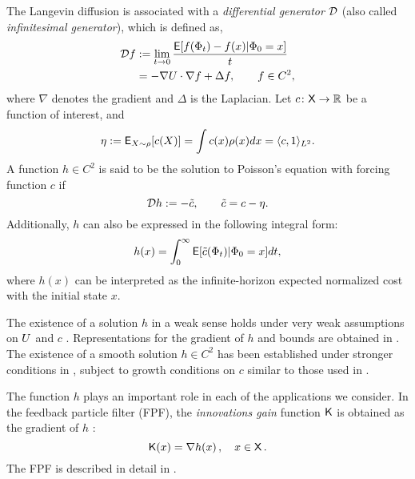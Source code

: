 
The Langevin diffusion is associated with a \textit{differential generator} ${\cal D}$ (also called \textit{infinitesimal generator}), which is defined as,
\begin{equation}
\begin{aligned}
\generate f &:= \lim_{t \to 0} \frac{\Expect [ f(\markovstate_t) - f(x) | \markovstate_0 = x]}{t} \\
& = -\nabla \pot \cdot \nabla f + \Delta f,\qquad f\in C^2,
\label{e:lang_generator}
\end{aligned}
\end{equation}
where $\nabla$ denotes the gradient and $\Delta$ is the Laplacian. Let $c \colon {\sf X} \to \mathbb{R}$ be a function of interest, and 
\[
\eta := {\sf E}_{X \sim \rho}[c(X)] =  \int c(x) \rho(x) dx = \langle c, 1 \rangle_{L^2}.
\]
A function $h\in C^2$ is said to be the solution to Poisson's equation with forcing function $c$ if
\begin{equation}
\generate h := - \tilc, \qquad  \tilc = c - \eta.
\label{e:poissons}
\end{equation}
Additionally, $h$ can also be expressed in the following integral form:
\[
h(x) =\int_0^\infty {\sf E}[\tilde c(\Phi_t)|\Phi_0 = x] dt,
\]
where $h(x)$ can be interpreted as the infinite-horizon expected normalized cost with the initial state $x$. 

The existence of a solution $h$ in a weak sense holds under very weak assumptions on $U$ and $c$  \cite{glymey96a,konmey12a}.   Representations for the gradient of $h$ and bounds are obtained in \cite{laumehmeyrag15,devkonmey17b}.   The existence of  a  smooth solution $h\in C^2$ has been established under stronger conditions in \cite{parver01}, subject to growth conditions on $c$ similar to those used in  \cite{glymey96a}. 

The function $h$ plays an important role in each of the applications we consider. In the feedback particle filter (FPF), the \textit{innovations gain} function $\text{\sf K}$ is obtained as  the gradient of $h$ \cite{yanmehmey13}:
\begin{equation}
\kFPF (x) = \nabla h(x)\, ,  \quad x\in\state\, .
\label{e:kfpfgain}
\end{equation}
The FPF is described in detail in \Chapter{}.

